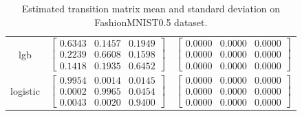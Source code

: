 \documentclass{article} %
\begin{document}
\begin{table}
\begin{tabular}{ccc}
lgb & $\begin{bmatrix}0.6343 & 0.1457 & 0.1949\\0.2239 & 0.6608 & 0.1598\\0.1418 & 0.1935 & 0.6452\end{bmatrix}$ & $\begin{bmatrix}0.0000 & 0.0000 & 0.0000\\0.0000 & 0.0000 & 0.0000\\0.0000 & 0.0000 & 0.0000\end{bmatrix}$\\
logistic & $\begin{bmatrix}0.9954 & 0.0014 & 0.0145\\0.0002 & 0.9965 & 0.0454\\0.0043 & 0.0020 & 0.9400\end{bmatrix}$ & $\begin{bmatrix}0.0000 & 0.0000 & 0.0000\\0.0000 & 0.0000 & 0.0000\\0.0000 & 0.0000 & 0.0000\end{bmatrix}$\\
\end{tabular}\caption{
  Estimated transition matrix mean and standard deviation on FashionMNIST0.5 dataset.
  \label{tab:T-FashionMNIST0.5}
}\end{table}
\end{document}
